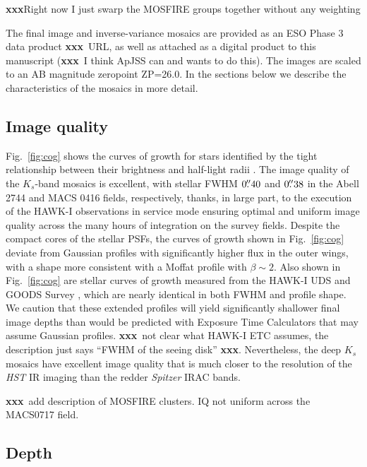 \documentclass[iop, numberedappendix]{emulateapj}
\gdef\xxx{\textbf{xxx}}
\begin{document}
\xxx Right now I just swarp the MOSFIRE groups together without any weighting

The final image and inverse-variance mosaics are provided as an ESO Phase 3 data product \xxx\ URL, as well as attached as a digital product to this manuscript (\xxx\ I think ApJSS can and wants to do this).  The images are scaled to an AB magnitude zeropoint ZP=26.0.  In the sections below we describe the characteristics of the mosaics in more detail.  

\subsection{Image quality}
\label{s:fwhm}

Fig.~\ref{fig:cog} shows the curves of growth for stars identified by the tight relationship between their brightness and half-light radii \citep[see, e.g., Fig.~13 of][]{skelton:14}.  The image quality of the $K_s$-band mosaics is excellent, with stellar FWHM $0\mbox{$.\!\!^{\prime\prime}$}40$ and $0\mbox{$.\!\!^{\prime\prime}$}38$ in the Abell 2744 and MACS 0416 fields, respectively, thanks, in large part, to the execution of the HAWK-I observations in service mode ensuring optimal and uniform image quality across the many hours of integration on the survey fields.  Despite the compact cores of the stellar PSFs, the curves of growth shown in Fig.~\ref{fig:cog} deviate from Gaussian profiles with significantly higher flux in the outer wings, with a shape more consistent with a Moffat profile \citep{trujillo:01}  with $\beta\sim2$.  Also shown in Fig.~\ref{fig:cog} are stellar curves of growth measured from the HAWK-I UDS and GOODS Survey \citep[HUGS;][]{hugs}, which are nearly identical in both FWHM and profile shape.  We caution that these extended profiles will yield significantly shallower final image depths than would be predicted with Exposure Time Calculators that may assume Gaussian profiles. \xxx\ not clear what HAWK-I ETC assumes, the description just says ``FWHM of the seeing disk'' \xxx.  Nevertheless, the deep $K_s$ mosaics have excellent image quality that is much closer to the resolution of the \textit{HST} IR imaging than the redder \textit{Spitzer} IRAC bands.

\xxx\ add description of MOSFIRE clusters.  IQ not uniform across the MACS0717 field.

\subsection{Depth}
\label{s:depth}
\end{document}
